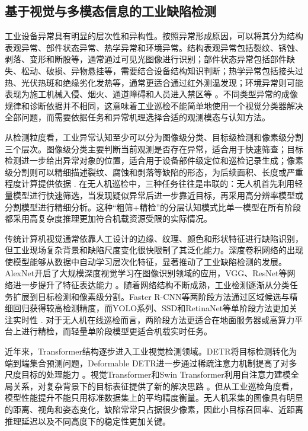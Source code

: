\subsection{基于视觉与多模态信息的工业缺陷检测}

工业设备异常具有明显的层次性和异构性。按照异常形成原因，可以将其分为结构表观异常、部件状态异常、热学异常和环境异常。结构表观异常包括裂纹、锈蚀、剥落、变形和断股等，通常通过可见光图像进行识别；部件状态异常包括部件缺失、松动、破损、异物悬挂等，需要结合设备结构知识判断；热学异常包括接头过热、光伏热斑和绝缘劣化发热等，通常更适合通过红外测温发现；环境异常则可能表现为施工机械入侵、烟火、通道障碍和人员进入禁区等
\cite{taox2021survey,nguyen2018automatic,miao2020uav}。不同类型异常的成像规律和诊断依据并不相同，这意味着工业巡检不能简单地使用一个视觉分类器解决全部问题，而需要依据任务和异常机理选择合适的观测模态与认知方法。

从检测粒度看，工业异常认知至少可以分为图像级分类、目标级检测和像素级分割三个层次。图像级分类主要判断当前观测是否存在异常，适合用于快速筛查；目标检测进一步给出异常对象的位置，适合用于设备部件级定位和巡检记录生成；像素级分割则可以精细描述裂纹、腐蚀和剥落等缺陷的形态，为后续面积、长度或严重程度计算提供依据
\cite{taox2021survey}. 在无人机巡检中，三种任务往往是串联的：无人机首先利用轻量模型进行快速筛选，当发现疑似异常后进一步靠近目标，再采用高分辨率模型或分割模型进行精细分析。这种“粗筛+精检”的分层认知模式比单一模型在所有阶段都采用高复杂度推理更加符合机载资源受限的实际情况。

传统计算机视觉通常依靠人工设计的边缘、纹理、颜色和形状特征进行缺陷识别，但工业现场复杂背景和缺陷尺度变化很快限制了其泛化能力。深度卷积网络的出现使模型能够从数据中自动学习层次化特征，显著推动了工业缺陷检测的发展。AlexNet开启了大规模深度视觉学习在图像识别领域的应用，VGG、ResNet等网络进一步提升了特征表达能力
\cite{krizhevsky2012imagenet,simonyan2015very,he2016deep}。随着网络结构不断成熟，工业检测逐渐从分类任务扩展到目标检测和像素级分割。Faster R-CNN等两阶段方法通过区域候选与精细回归获得较高检测精度，而YOLO系列、SSD和RetinaNet等单阶段方法更加关注实时性
\cite{ren2015faster,redmon2016you,liu2016ssd,lin2017focal}. 对于无人机在线巡检而言，两阶段方法更适合在地面服务器或高算力平台上进行精检，而轻量单阶段模型更适合机载实时任务。

近年来，Transformer结构逐步进入工业视觉检测领域。DETR将目标检测转化为端到端集合预测问题，Deformable DETR进一步通过稀疏注意力机制提高了对多尺度目标的处理能力
\cite{carion2020end,zhu2021deformable}。视觉Transformer和Swin Transformer利用自注意力建模全局关系，对复杂背景下的目标表征提供了新的解决思路
\cite{dosovitskiy2021image,liu2021swin,vaswani2017attention}。但从工业巡检角度看，模型性能提升不能只用标准数据集上的平均精度衡量。无人机采集的图像具有明显的距离、视角和姿态变化，缺陷常常只占据很少像素，因此小目标召回率、近距离推理延迟以及不同高度下的稳定性更加关键。

